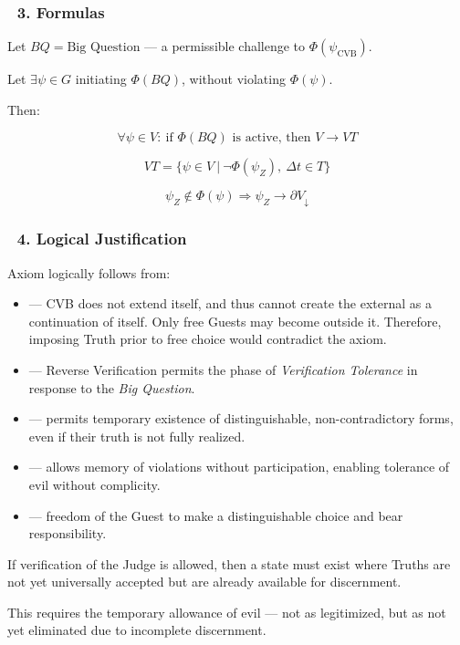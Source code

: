\documentclass[12pt]{article}
\begin{document}
\subsubsection*{🔹 3. Formulas}

Let $BQ = \text{Big Question}$ — a permissible challenge to $\Phi(\psi_{\text{CVB}})$.

Let $\exists \psi \in G$ initiating $\Phi(BQ)$, without violating $\Phi(\psi)$.

Then:

\[
\forall \psi \in V:\ 
\text{if } \Phi(BQ) \text{ is active, then } V \to VT
\]

\[
VT = \{ \psi \in V \ |\ \neg \Phi(\psi_Z),\ \Delta t \in T \}
\]

\[
\psi_Z \notin \Phi(\psi) \Rightarrow \psi_Z \to \partial V_{\downarrow}
\]

\subsubsection*{🔹 4. Logical Justification}

Axiom \text{[26]} logically follows from:

\begin{itemize}
\item \text{[13]} — CVB does not extend itself, and thus cannot create the external as a continuation of itself. Only free Guests may become outside it. Therefore, imposing Truth prior to free choice would contradict the axiom.
\item \text{[25]} — Reverse Verification permits the phase of \textit{Verification Tolerance} in response to the \textit{Big Question}.
\item \text{[11.1.1]} — permits temporary existence of distinguishable, non-contradictory forms, even if their truth is not fully realized.
\item \text{[16]} — allows memory of violations without participation, enabling tolerance of evil without complicity.
\item \text{[23]} — freedom of the Guest to make a distinguishable choice and bear responsibility.
\end{itemize}

If verification of the Judge is allowed, then a state must exist where Truths are not yet universally accepted but are already available for discernment.

This requires the temporary allowance of evil — not as legitimized, but as not yet eliminated due to incomplete discernment.
\end{document}
